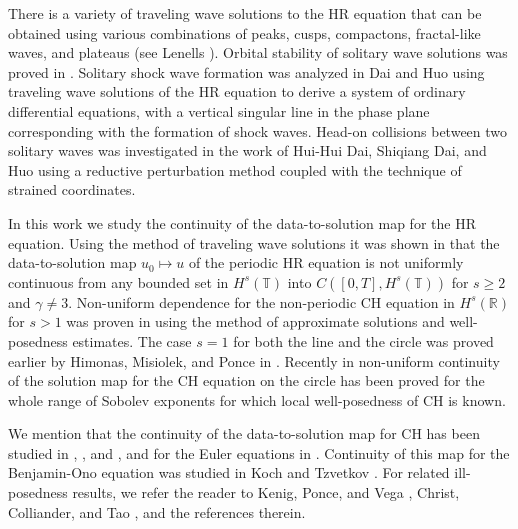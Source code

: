 \documentclass[12pt,reqno]{amsart}
\newcommand{\rr}{\mathbb{R}}
\newcommand{\ci}{\mathbb{T}}
\theoremstyle{plain}  %
\theoremstyle{definition}
\begin{document}
There is a variety of traveling wave solutions to the HR equation that can be 
obtained using various combinations of peaks, cusps, compactons, 
fractal-like waves, and plateaus (see Lenells 
\cite{Lenells_2006_Traveling-waves}). Orbital stability of solitary wave 
solutions was proved in \cite{Constantin_2000_Stability-of-a-}.
Solitary shock wave formation was 
analyzed in Dai and Huo \cite{Dai_2000_Solitary-shock-} using traveling 
wave solutions of the HR equation to derive a system of ordinary differential 
equations, with a vertical singular line in the phase plane corresponding with the 
formation of shock waves. Head-on collisions between two solitary 
waves was investigated in the work of Hui-Hui Dai, 
Shiqiang Dai, and Huo \cite{Dai_2000_Head-on-collisi} using a reductive 
perturbation method coupled with the technique of strained coordinates. 

In this work we study the continuity of the data-to-solution map for the HR 
equation.
Using the method of traveling wave solutions it was shown in  
\cite{Olson_2006_Non-uniform-dep} that the data-to-solution map
$u_0  \mapsto u$ of the periodic HR equation is not uniformly continuous 
from any bounded set in $H^s(\ci)$ into $C([0, T ], H^s(\ci))$ for $s \ge 
2$ and $\gamma \neq 3$. Non-uniform dependence for the non-periodic CH 
equation in 
$H^s(\rr)$ for $s>1$ was proven in \cite{Himonas_2009_Non-uniform-dep} 
using the method of approximate solutions and well-posedness estimates. The 
case $s=1$ for both the line and the circle
 was proved earlier by Himonas, Misiolek, and Ponce in 
 \cite{Himonas_2007_Non-uniform-con}.
 Recently  in \cite{Himonas_2009_Non-uniform-dep-per} non-uniform 
 continuity of the solution map for the CH equation
 on the circle has been proved
 for the whole range of Sobolev exponents for which local well-posedness of 
 CH is known.
 
 We mention that the continuity of the data-to-solution map  for CH has 
 been studied in  \cite{Himonas_2007_Non-uniform-con},
 \cite{Himonas_2001_The-Cauchy-prob}, and 
 \cite{Himonas_2005_High-frequency-}, and for the Euler equations in 
 \cite{Himonas_2009_Non-uniform-dep-euler}. Continuity of this map for  
 the  Benjamin-Ono equation was studied in  Koch and  Tzvetkov 
 \cite{Koch_2005_Nonlinear-wave-}. For related ill-posedness results, we 
 refer the reader to Kenig, Ponce, and  Vega 
 \cite{Kenig_2001_On-the-ill-pose}, Christ, Colliander, and Tao 
 \cite{Christ_2003_Asymptotics-fre}, and the references 
 therein.
\end{document}

